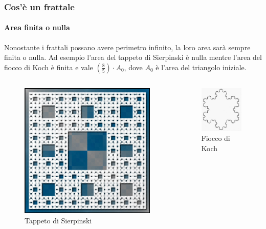 \documentclass{beamer}
\begin{document}
		\begin{frame}
			\frametitle{Cos'è un frattale}
			\framesubtitle{Area finita o nulla}
			Nonostante i frattali possano avere perimetro infinito, la loro area sarà sempre finita o nulla.
			Ad esempio l'area del tappeto di Sierpinski è nulla mentre l'area del fiocco di Koch è finita e vale $\left( \frac{8}{5} \right) \cdot A_0$, dove $A_0$ è l'area del triangolo iniziale.
			\begin{columns}
				\begin{column}{0.5\textwidth}
					\begin{figure}[h]
						\centering
						\includegraphics[width=0.5\linewidth]{"../Tappeto di Sierpinski/tappeto_sierpinski"}
						\caption{Tappeto di Sierpinski}
						\label{fig:tappeto_sierpinski}
					\end{figure}
				\end{column}
				\begin{column}{0.5\textwidth}
					\begin{figure}[h]
						\centering
						\includegraphics[width=0.7\linewidth]{"../Fiocco di Koch/fioccodineve"}
						\caption{Fiocco di Koch}
						\label{fig:fiocco_koch}
					\end{figure}
				\end{column}
			\end{columns}
		\end{frame}
\end{document}
